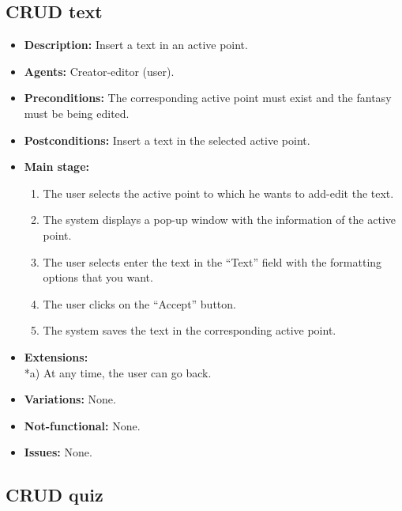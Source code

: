 \subsection{CRUD text}
\begin{itemize}
	\item \textbf{Description:} Insert a text in an active point.
	\item \textbf{Agents:} Creator-editor (user).
	\item \textbf{Preconditions:} The corresponding active point must exist and the fantasy must be being edited.
	\item \textbf{Postconditions:} Insert a text in the selected active point.
	\item \textbf{Main stage:}
	\begin{enumerate}
		\item The user selects the active point to which he wants to add-edit the text.
		\item The system displays a pop-up window with the information of the active point.
		\item The user selects enter the text in the ``Text'' field with the formatting options that you want.
		\item The user clicks on the ``Accept'' button.
		\item The system saves the text in the corresponding active point.
	\end{enumerate}
	\item \textbf{Extensions:} \\ *a) At any time, the user can go back.
	\item \textbf{Variations:} None.
	\item \textbf{Not-functional:} None.
	\item \textbf{Issues:} None.
\end{itemize}

\subsection{CRUD quiz}
\hypertarget{crearquiz}{}
